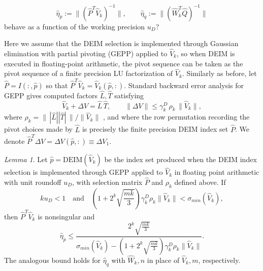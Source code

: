 \documentclass[12pt, a4paper]{article}
\newcommand{\What}{\widehat{W}}
\newcommand{\Vhat}{\widehat{V}}
\newcommand{\Lhat}{\widehat{L}}
\newcommand{\Phat}{\widehat{P}}
\newcommand{\Qhat}{\widehat{Q}}
\newcommand{\That}{\widehat{T}}
\def\norm#1{\|#1\|}
\theoremstyle{remark}
\newtheorem{lemma}[theorem]{Lemma}
\begin{document}
\begin{equation}
  \widehat\eta_p := \norm{(\Phat^T\Vhat_k)^{-1}}, \qquad \widehat\eta_q := \norm{(\What_k^T\Qhat)^{-1}}
  \label{eq:eta-hat}
\end{equation}
behave as a function of the working precision $u_{D}$? 

Here we assume that the DEIM selection is implemented through Gaussian elimination
with partial pivoting (GEPP) applied to $\Vhat_k$, so when DEIM is executed
in floating-point arithmetic, the pivot sequence can be taken as the pivot sequence of a
finite precision LU factorization of $\Vhat_k$. Similarly as before, let $\Phat= I(:,\hat{p})$ so that $\Phat^T\Vhat_k = \Vhat_k(\hat{p},:)$. Standard backward error analysis
for GEPP \cite{higham2002accuracy} gives computed factors $\Lhat,\That$ satisfying
\begin{equation}
  \Vhat_k + \Delta V = \Lhat\,\That, \qquad \norm{\Delta V} \le \gamma^D_k\,\rho_k\,\norm{\Vhat_k},
  \label{eq:finite-lu-backward}
\end{equation}
where 
 $\rho_k = \|\,  |\Lhat| |\That|\,\|/\|\Vhat_k \|$ , and where the row permutation recording the pivot choices
made by $\Lhat$ is precisely the finite precision DEIM index set $\Phat$. We denote $\Phat^T \Delta V = \Delta V(\hat{p},:) \equiv \Delta V_1$.

\begin{lemma}
\label{lem:eta-bound-fp}
Let $\hat p=\mathrm{DEIM}(\Vhat_k)$ be the index set produced when the DEIM index selection is implemented through GEPP applied to $\Vhat_k$ in floating point arithmetic with unit roundoff $u_{D}$, with selection matrix $\Phat$ and  
$\rho_k$ defined above. If 
\begin{equation}
    ku_D < 1 \quad\text{and}\quad \left(1+ 2^k \sqrt{\frac{mk}{3}} \right)\gamma^D_k\rho_k\|\Vhat_k\| < \sigma_{min}(\Vhat_k),
    \label{eq:assumptions}
\end{equation}
then $\Phat^T \Vhat_k$ is nonsingular and
\begin{equation}
  \hat\eta_p \leq \frac{2^k \sqrt{\frac{mk}{3}}}{\sigma_{min}(\Vhat_k)- \left(1+2^k\sqrt{\frac{mk}{3}} \right) \gamma^D_k \rho_k \|\Vhat_k\|}.
  \label{eq:eta-bound-fp}
\end{equation}
The analogous bound holds for $\hat\eta_q$ with $\What_k,n$ in place of $\Vhat_k,m$, respectively.
\end{lemma}
\end{document}
